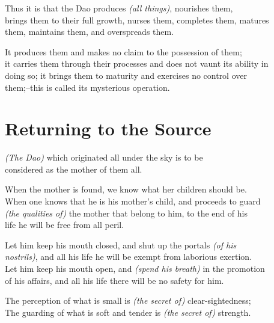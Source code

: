     Thus it is that the Dao produces \textit{(all things)}, nourishes them,\\
    brings them to their full growth, nurses them, completes them, matures\\
    them, maintains them, and overspreads them.\vspace{\baselineskip}
    
    It produces them and makes no claim to the possession of them;\\
    it carries them through their processes and does not vaunt its ability in\\
    doing so; it brings them to maturity and exercises no control over\\
    them;--this is called its mysterious operation.\vspace{\baselineskip}
    
\section*{Returning to the Source}
    \textit{(The Dao)} which originated all under the sky is to be\\
    considered as the mother of them all.\vspace{\baselineskip}
    
    When the mother is found, we know what her children should be.\\
    When one knows that he is his mother's child, and proceeds to guard\\
    \textit{(the qualities of)} the mother that belong to him, to the end of his\\
    life he will be free from all peril.\vspace{\baselineskip}
    
    Let him keep his mouth closed, and shut up the portals \textit{(of his\\
    nostrils)}, and all his life he will be exempt from laborious exertion.\\
    Let him keep his mouth open, and \textit{(spend his breath)} in the promotion\\
    of his affairs, and all his life there will be no safety for him.\vspace{\baselineskip}
    
    The perception of what is small is \textit{(the secret of)} clear-sightedness;\\
    The guarding of what is soft and tender is \textit{(the secret of)} strength.\\
    
